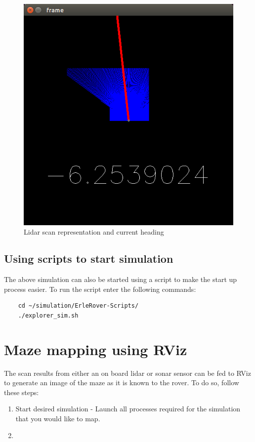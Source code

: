 \documentclass{report}
\begin{document}
\begin{figure}[ht]
	\centering
	\includegraphics[scale=0.33]{Images/rover_maze_3}
	\caption{Lidar scan representation and current heading}
	\label{lidarRepresentation}
\end{figure}

\subsection{Using scripts to start simulation}
The above simulation can also be started using a script to make the start up process easier. To run the script enter the following commands:

\begin{lstlisting}
	cd ~/simulation/ErleRover-Scripts/
	./explorer_sim.sh 
\end{lstlisting}

\section{Maze mapping using RViz}
The scan results from either an on board lidar or sonar sensor can be fed to RViz to generate an image of the maze as it is known to the rover. To do so, follow these steps:

\begin{enumerate}
	\item Start desired simulation - Launch all processes required for the simulation that you would like to map.
	
	\item 
\end{enumerate}
\end{document}
